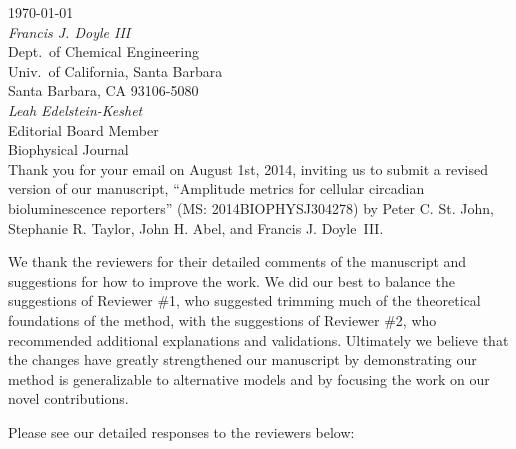 \documentclass[11pt, letterpaper]{article}
\begin{document}
\today\\

{\itshape Francis J. Doyle III}\\
Dept.\ of Chemical Engineering\\
Univ.\ of California, Santa Barbara\\
Santa Barbara, CA 93106-5080\\

{\itshape Leah Edelstein-Keshet}\\
Editorial Board Member\\
Biophysical Journal\\

Thank you for your email on August 1st, 2014, inviting us to submit a revised version of our manuscript, ``Amplitude metrics for cellular circadian bioluminescence reporters'' (MS: 2014BIOPHYSJ304278) by Peter C. St. John, Stephanie R. Taylor, John H. Abel, and Francis J. Doyle~III.

We thank the reviewers for their detailed comments of the manuscript and suggestions for how to improve the work. We did our best to balance the suggestions of Reviewer \#1, who suggested trimming much of the theoretical foundations of the method, with the suggestions of Reviewer \#2, who recommended additional explanations and validations. Ultimately we believe that the changes have greatly strengthened our manuscript by demonstrating our method is generalizable to alternative models and by focusing the work on our novel contributions.

Please see our detailed responses to the reviewers below: 
\end{document}
